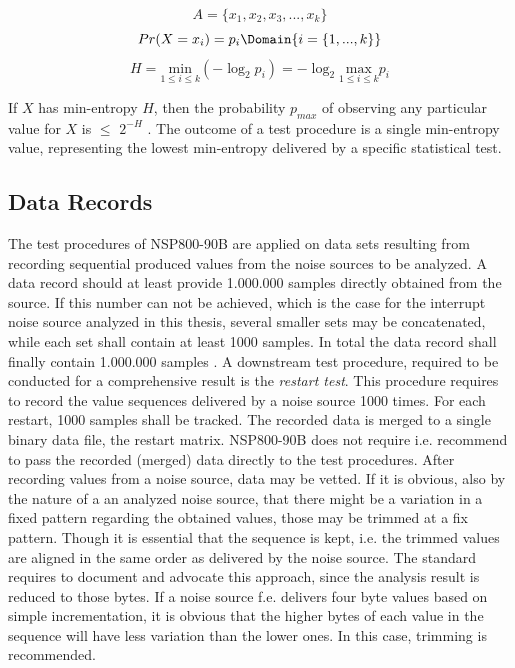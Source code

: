 \begin{equation}
A = \{x_1, x_2, x_3, ..., x_k\}
\label{eq:min-ent-A}
\end{equation}
\begin{equation}
Pr(X=x_i) = p_i 
\Domain{i=\{1,...,k\}}
\end{equation}
\begin{equation}
H = \underset{1\leq i\leq k}{\mathrm{min}}(-\log_2p_i) = -\log_2 \underset{1\leq i\leq k}{\mathrm{max}}p_i
\end{equation}

If $X$ has min-entropy $H$, then the probability $p_{max}$ of observing any particular value for $X$ is $\le$ $2^{-H}$ \cite{turan2018nist}. The outcome of a test procedure is a single min-entropy value, representing the lowest min-entropy delivered by a specific statistical test.

\subsection{Data Records}\label{sub:data-records}
The test procedures of NSP800-90B are applied on data sets resulting from recording sequential produced values from the noise sources to be analyzed. A data record should at least provide 1.000.000 samples directly obtained from the source. If this number can not be achieved, which is the case for the interrupt noise source analyzed in this thesis, several smaller sets may be concatenated, while each set shall contain at least 1000 samples. In total the data record shall finally contain 1.000.000 samples \cite{turan2018nist}. A downstream test procedure, required to be conducted for a comprehensive result is the \textit{restart test}. This procedure requires to record the value sequences delivered by a noise source 1000 times. For each restart, 1000 samples shall be tracked. The recorded data is merged to a single binary data file, the restart matrix. 
NSP800-90B does not require i.e. recommend to pass the recorded (merged) data directly to the test procedures. After recording values from a noise source, data may be vetted. If it is obvious, also by the nature of a an analyzed noise source, that there might be a variation in a fixed pattern regarding the obtained values, those may be trimmed at a fix pattern. Though it is essential that the sequence is kept, i.e. the trimmed values are aligned in the same order as delivered by the noise source. The standard requires to document and advocate this approach, since the analysis result is reduced to those bytes. If a noise source f.e. delivers four byte values based on simple incrementation, it is obvious that the higher bytes of each value in the sequence will have less variation than the lower ones. In this case, trimming is recommended.

